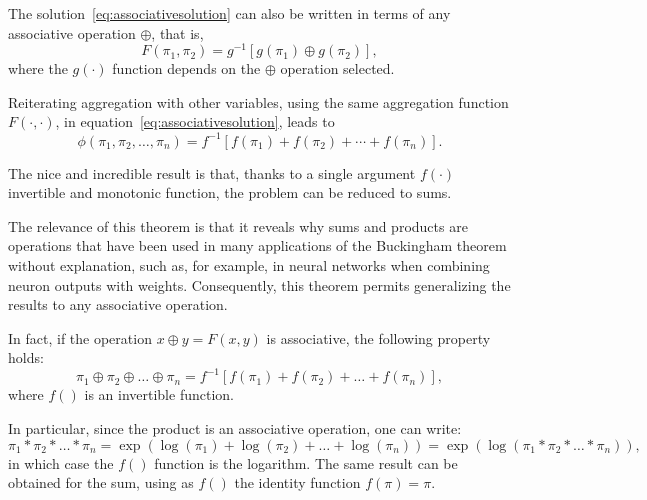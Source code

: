 \documentclass[
	11pt, %
	fleqn, %
	a4paper, %
]{LegrandOrangeBook}
\begin{document}
\begin{corollary}
\label{cor:associativegeneral}
The solution~\eqref{eq:associativesolution} can also be written in terms of any associative operation $\oplus$, that is,
\begin{equation}
F(\pi_1,\pi_2) = g^{-1}[g(\pi_1) \oplus g(\pi_2)],
\label{eq:generalassociative}
\end{equation}
where the $g(\cdot)$ function depends on the $\oplus$ operation selected.
\end{corollary}

Reiterating aggregation with other variables, using the same aggregation function $F(\cdot,\cdot)$, in equation~\eqref{eq:associativesolution}, leads to
\begin{equation}
\phi(\pi_1,\pi_2,\ldots,\pi_n) = f^{-1}[f(\pi_1) + f(\pi_2) + \cdots + f(\pi_n)].
\label{eq:n_variableassociative}
\end{equation}

The nice and incredible result is that, thanks to a single argument $f(\cdot)$ invertible and monotonic function, the problem can be reduced to sums.

The relevance of this theorem is that it reveals why sums and products are operations that have been used in many applications of the Buckingham theorem without explanation, such as, for example, in neural networks when combining neuron outputs with weights. Consequently, this theorem permits generalizing the results to any associative operation.

In fact, if the operation $x \oplus y=F(x,y)$ is associative, the following property holds:
\begin{equation}
\pi_1\oplus \pi_2 \oplus \ldots \oplus \pi_n = f^{-1}[f(\pi_1)+f(\pi_2)+\ldots+f(\pi_n)],
\label{eq:associativeproperty}
\end{equation}
where $f()$ is an invertible function.

In particular, since the product is an associative operation, one can write:
\begin{equation}
\pi_1 * \pi_2 * \ldots * \pi_n = \exp(\log(\pi_1)+\log(\pi_2)+\ldots+\log(\pi_n)) = \exp(\log(\pi_1 *\pi_2 * \ldots * \pi_n)),
\label{eq:productexample}
\end{equation}
in which case the $f()$ function is the logarithm. The same result can be obtained for the sum, using as $f()$ the identity function $f(\pi)=\pi$.
\end{document}
